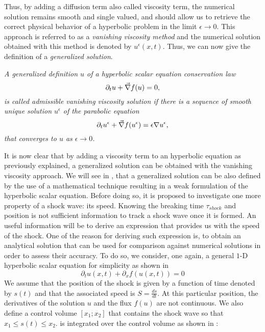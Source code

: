 Thus, by adding a diffusion term also called viscosity term, the numerical solution remains smooth and single valued, and should allow us to retrieve the correct physical behavior of a hyperbolic problem in the limit $\epsilon \to 0$. This approach is referred to as a \emph{vanishing viscosity method} and the numerical solution obtained with this method is denoted by $u^{\epsilon}(x,t)$. Thus, we can now give the definition of a \emph{generalized solution}. 
%
\begin{definition}
\emph{
A generalized definition $u$ of a hyperbolic scalar equation conservation law 
\begin{equation}
\partial_t u + \vec{\nabla} f(u) = 0, \nonumber
\end{equation}
is called admissible vanishing viscosity solution if there is a sequence of smooth unique solution $u^{\epsilon}$ of the parabolic equation 
\begin{equation}
\partial_t u^{\epsilon} +  \vec{\nabla} f(u^{\epsilon}) = \epsilon \nabla u^{\epsilon}, \nonumber
\end{equation}
that converges to $u$ as $\epsilon \to 0$.}
\end{definition}
%
It is now clear that by adding a viscosity term to an hyperbolic equation as previously explained, a generalized solution can be obtained with the vanishing viscosity approach. We will see in , that a generalized solution can be also defined by the use of a mathematical technique resulting in a weak formulation of the hyperbolic scalar equation. Before doing so, it is proposed to investigate one more property of a shock wave: its speed. Knowing the breaking time $\tau_{shock}$ and position is not sufficient information to track a shock wave once it is formed. An useful information will be to derive an expression that provides us with the speed of the shock. One of the reason for deriving such expression is, to obtain an analytical solution that can be used for comparison against numerical solutions in order to assess their accuracy. To do so, we consider, one again, a general $1$-D hyperbolic scalar equation for simplicity as shown in 
%
\begin{equation}\label{eq:rh_sct1b}
\partial_t u(x,t) + \partial_x f(u(x,t)) = 0
\end{equation}
%
We assume that the position of the shock is given by a function of time denoted by $s(t)$ and that the associated speed is $S = \frac{ds}{dt}$. At this particular position, the derivatives of the solution $u$ and the flux $f(u)$ are not continuous. We also define a control volume $\left[ x_1; x_2 \right]$ that contains the shock wave so that $x_1 \leq s(t) \leq x_2$.  is integrated over the control volume as shown in :
